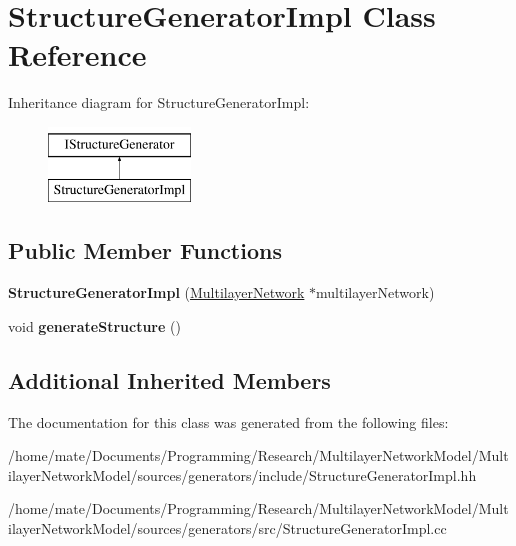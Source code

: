\hypertarget{classStructureGeneratorImpl}{}\section{Structure\+Generator\+Impl Class Reference}
\label{classStructureGeneratorImpl}
Inheritance diagram for Structure\+Generator\+Impl\+:\begin{figure}[H]
\begin{center}
\leavevmode
\includegraphics[height=2.000000cm]{classStructureGeneratorImpl}
\end{center}
\end{figure}
\subsection*{Public Member Functions}
\begin{DoxyCompactItemize}
\item 
{\bfseries Structure\+Generator\+Impl} (\hyperlink{classMultilayerNetwork}{Multilayer\+Network} $\ast$multilayer\+Network)\hypertarget{classStructureGeneratorImpl_a0e4efd8bc7d6f805054578026201ae38}{}\label{classStructureGeneratorImpl_a0e4efd8bc7d6f805054578026201ae38}

\item 
void {\bfseries generate\+Structure} ()\hypertarget{classStructureGeneratorImpl_a775184223dfef6f0e771589db2049993}{}\label{classStructureGeneratorImpl_a775184223dfef6f0e771589db2049993}

\end{DoxyCompactItemize}
\subsection*{Additional Inherited Members}


The documentation for this class was generated from the following files\+:\begin{DoxyCompactItemize}
\item 
/home/mate/\+Documents/\+Programming/\+Research/\+Multilayer\+Network\+Model/\+Multilayer\+Network\+Model/sources/generators/include/Structure\+Generator\+Impl.\+hh\item 
/home/mate/\+Documents/\+Programming/\+Research/\+Multilayer\+Network\+Model/\+Multilayer\+Network\+Model/sources/generators/src/Structure\+Generator\+Impl.\+cc\end{DoxyCompactItemize}
